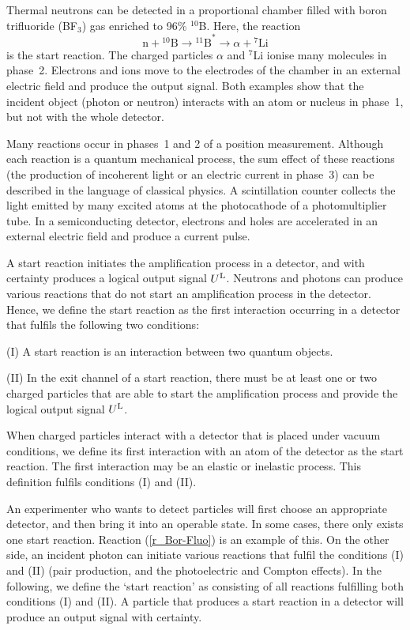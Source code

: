 \documentclass[12pt]{article}
\begin{document}
Thermal neutrons can be detected in a proportional chamber filled with boron trifluoride (BF$_3$) gas enriched to 96\% $^{10}$B.  Here, the reaction 
%
\begin{equation}\label{r_Bor-Fluo} 
\mbox{n} + \mbox{$^{10}$B} \to \mbox{$^{11}$B}^* \to \alpha + \mbox{$^7$Li}  
\end{equation}
%
is the start reaction.  
The charged particles $\alpha$ and $^7$Li ionise many molecules in phase~2.  
Electrons and ions move to the electrodes of the chamber in an external electric field and produce the output signal.  
Both examples show that the incident object (photon or neutron) interacts with an atom or nucleus in phase~1, but not with the whole detector.  

Many reactions occur in phases~1 and 2 of a position measurement.  
Although each reaction is a quantum mechanical process, the sum effect of these reactions (the production of incoherent light or an electric current in phase~3) can be described in the language of classical physics.  
A scintillation counter collects the light emitted by many excited atoms at the photocathode of a photomultiplier tube.   
In a semiconducting detector, electrons and holes are accelerated in an external electric field and produce a current pulse.  
 
A start reaction initiates the amplification process in a detector, and with certainty produces a logical output signal $U^{\rm L}$.  
Neutrons and photons can produce various reactions that do not start an amplification process in the detector.  
Hence, we define the start reaction as the first interaction occurring in a detector that fulfils the following two conditions:  

(I) A start reaction is an interaction between two quantum objects.  

(II) In the exit channel of a start reaction, there must be at least one or two charged particles that are able to start the amplification process and provide the logical output signal $U^{\rm L}$.  

When charged particles interact with a detector that is placed under vacuum conditions, we define its first interaction with an atom of the detector as the start reaction.  The first interaction may be an elastic or inelastic process.  
This definition fulfils conditions (I) and (II).  

An experimenter who wants to detect particles will first choose an appropriate detector, and then bring it into an operable state.  In some cases, there only exists one start reaction. Reaction (\ref{r_Bor-Fluo}) is an example of this.  
On the other side, an incident photon can initiate various reactions that fulfil the conditions (I) and (II) (pair production, and the photoelectric and Compton effects).  In the following, we define the `start reaction' as consisting of all reactions fulfilling both conditions (I) and (II).  
A particle that produces a start reaction in a detector will produce an output signal with certainty.  
\end{document}
